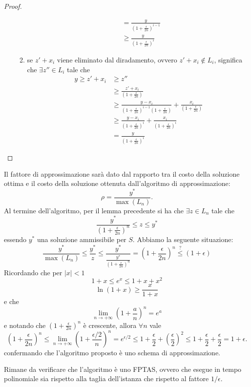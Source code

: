 \begin{proof}
\begin{enumerate}
\begin{enumerate}
\[\begin{split}
&= \frac{y}{\left(1+\frac{\epsilon}{2n}\right)^{i-1}} \\
&\geq \frac{y}{\left(1+\frac{\epsilon}{2n}\right)^{i}}
\end{split}
\]
\item se $z'+x_i$ viene eliminato dal diradamento, ovvero $z'+x_i\notin L_i$, significa che $\exists z'' \in L_i$ tale che
\[
\begin{split}
y \geq z'+x_i &\geq z'' \\
&\geq \frac{z'+x_i}{\left(1+\frac{\epsilon}{2n}\right)} \\
&\geq \frac{y-x_i}{\left(1+\frac{\epsilon}{2n}\right)^{i-1}\left(1+\frac{\epsilon}{2n}\right)} +\frac{x_i}{\left(1+\frac{\epsilon}{2n}\right)} \\
&\geq \frac{y-x_i}{\left(1+\frac{\epsilon}{2n}\right)^{i}} +\frac{x_i}{\left(1+\frac{\epsilon}{2n}\right)^{i}} \\
&= \frac{y}{\left(1+\frac{\epsilon}{2n}\right)^{i}}
\end{split}
\]
\end{enumerate}
\end{enumerate}
\end{proof}

Il fattore di approssimazione sarà dato dal rapporto tra il costo della soluzione ottima e il costo della soluzione ottenuta dall'algoritmo di approssimazione:
\[
\rho = \frac{y^*}{\max(L_n)}.
\]
Al termine dell'algoritmo, per il lemma precedente si ha che $\exists z\in L_n$ tale che
\[
\frac{y^*}{\left(1+\frac{\epsilon}{2n}\right)^n} \leq z \leq y^*
\]
essendo $y^*$ una soluzione ammissibile per $S$.
Abbiamo la seguente situazione:
\[
\frac{y^*}{\max(L_n)} \leq \frac{y^*}{z} \leq \frac{y^*}{\frac{y^*}{\left(1+\frac{\epsilon}{2n}\right)^n}} = \left(1+\frac{\epsilon}{2n}\right)^n \overset{?}{\leq} (1+\epsilon)
\]
Ricordando che per $|x|<1$
\[
1+x \leq e^x \leq 1+x+x^2
\]
\[
\ln{(1+x)} \geq \frac{x}{1+x}
\]
e che
\[
\lim_{n \to +\infty} \left(1+\frac{a}{n}\right)^n = e^a
\]
e notando che $\left(1+\frac{\epsilon}{2n}\right)^n$ è crescente, allora $\forall n$ vale
\[
\left(1+\frac{\epsilon}{2n}\right)^n \leq \lim_{n \to +\infty} \left(1+\frac{\epsilon/2}{n}\right)^n = e^{\epsilon/2} \leq 1 + \frac{\epsilon}{2} + \left(\frac{\epsilon}{2}\right)^2 \leq 1 + \frac{\epsilon}{2} + \frac{\epsilon}{2} = 1 + \epsilon.
\]
confermando che l'algoritmo proposto è uno schema di approssimazione.

Rimane da verificare che l'algoritmo è uno FPTAS, ovvero che esegue in tempo polinomiale sia rispetto alla taglia dell'istanza che rispetto al fattore $1/\epsilon$.

